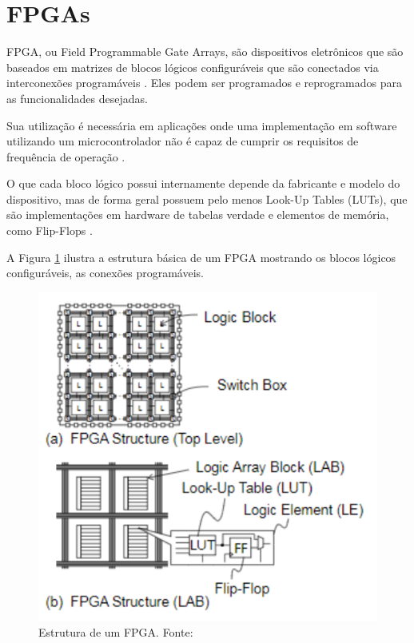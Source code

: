 \section{FPGAs}

FPGA, ou Field Programmable Gate Arrays, são dispositivos eletrônicos que são baseados em matrizes de blocos lógicos configuráveis que são conectados via interconexões programáveis \cite{AmdFpga}. Eles podem ser programados e reprogramados para as funcionalidades desejadas.

Sua utilização é necessária em aplicações onde uma implementação em software utilizando um microcontrolador não é capaz de cumprir os requisitos de frequência de operação \cite{Sulaiman}.

O que cada bloco lógico possui internamente depende da fabricante e modelo do dispositivo, mas de forma geral possuem pelo menos Look-Up Tables (LUTs), que são implementações em hardware de tabelas verdade e elementos de memória, como Flip-Flops \cite{Sato}.

A Figura \ref{fig:FPGAStructure} ilustra a estrutura básica de um FPGA mostrando os blocos lógicos configuráveis, as conexões programáveis.

\begin{figure}[H]
    \centering
    \includegraphics[scale=0.5]{figures/ReferencialTeorico/FPGAStructure.png}
    \caption{Estrutura de um FPGA. Fonte: \cite{Sato}}
    \label{fig:FPGAStructure}
\end{figure}

